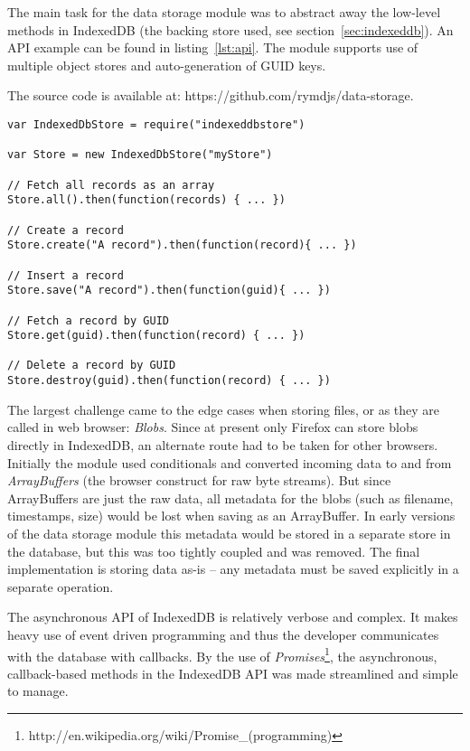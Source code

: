 The main task for the data storage module was to abstract away the low-level methods in IndexedDB (the backing store used, see section~\ref{sec:indexeddb}). An API example can be found in listing~\ref{lst:api}. The module supports use of multiple object stores and auto-generation of GUID keys.

The source code is available at: https://github.com/rymdjs/data-storage.

\begin{Code}
\begin{lstlisting}[caption={Common database operations}, label={lst:api}]
var IndexedDbStore = require("indexeddbstore")

var Store = new IndexedDbStore("myStore")

// Fetch all records as an array
Store.all().then(function(records) { ... })

// Create a record
Store.create("A record").then(function(record){ ... })

// Insert a record
Store.save("A record").then(function(guid){ ... })

// Fetch a record by GUID
Store.get(guid).then(function(record) { ... })

// Delete a record by GUID
Store.destroy(guid).then(function(record) { ... })
\end{lstlisting}
\end{Code}

The largest challenge came to the edge cases when storing files, or as they are called in web browser: \emph{Blobs}. Since at present only Firefox can store blobs directly in IndexedDB, an alternate route had to be taken for other browsers. Initially the module used conditionals and converted incoming data to and from \emph{ArrayBuffers} (the browser construct for raw byte streams). But since ArrayBuffers are just the raw data, all metadata for the blobs (such as filename, timestamps, size) would be lost when saving as an ArrayBuffer. In early versions of the data storage module this metadata would be stored in a separate store in the database, but this was too tightly coupled and was removed. The final implementation is storing data as-is – any metadata must be saved explicitly in a separate operation.

The asynchronous API of IndexedDB is relatively verbose and complex. It makes heavy use of event driven programming and thus the developer communicates with the database with callbacks. By the use of \emph{Promises}\footnote{http://en.wikipedia.org/wiki/Promise\_(programming)}, the asynchronous, callback-based methods in the IndexedDB API was made streamlined and simple to manage.

